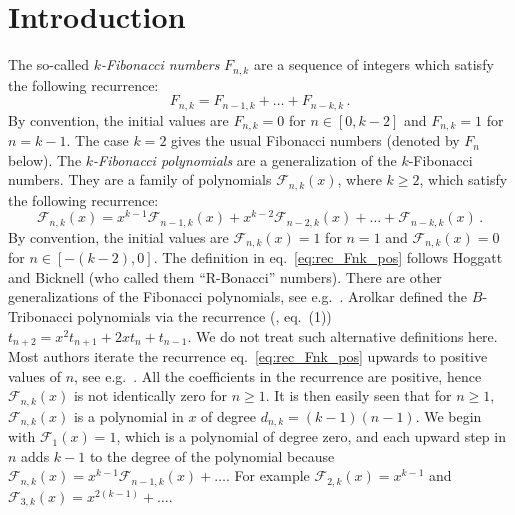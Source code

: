 \documentclass[review]{elsarticle}
\theoremstyle{plain}
\begin{document}
\section{Introduction}\label{sec:intro}
The so-called \textit{$k$-Fibonacci numbers} $F_{n,k}$ are a sequence of integers which satisfy the following recurrence:
\begin{equation}  
\label{eq:rec_Fnk_num}
F_{n,k} = F_{n-1,k} +\dots +F_{n-k,k} \,.
\end{equation}
By convention, the initial values are $F_{n,k}=0$ for $n\in[0,k-2]$ and $F_{n,k}=1$ for $n=k-1$.
The case $k=2$ gives the usual Fibonacci numbers (denoted by $F_n$ below).
The \textit{$k$-Fibonacci polynomials} are a generalization of the $k$-Fibonacci numbers.
They are a family of polynomials $\mathcal{F}_{n,k}(x)$, where $k\ge2$, which satisfy the following recurrence:
\begin{equation}  
\label{eq:rec_Fnk_pos}
\mathcal{F}_{n,k}(x) = x^{k-1}\mathcal{F}_{n-1,k}(x) +x^{k-2}\mathcal{F}_{n-2,k}(x) +\dots +\mathcal{F}_{n-k,k}(x) \,.
\end{equation}
By convention, the initial values are $\mathcal{F}_{n,k}(x)=1$ for $n=1$ and $\mathcal{F}_{n,k}(x)=0$ for $n\in[-(k-2),0]$.
The definition in eq.~\eqref{eq:rec_Fnk_pos} follows Hoggatt and Bicknell \cite{HoggattBicknell_FibGen} (who called them ``R-Bonacci'' numbers).
There are other generalizations of the Fibonacci polynomials, see e.g.~\cite{Ricci,Soykan}.
Arolkar defined the $B$-Tribonacci polynomials via the recurrence (\cite{Arolkar}, eq.~(1))
$t_{n+2} = x^2t_{n+1} +2xt_n + t_{n-1}$.
We do not treat such alternative definitions here.
Most authors iterate the recurrence eq.~\eqref{eq:rec_Fnk_pos}
upwards to positive values of $n$, see e.g.~\cite{Arslan_Uslu,Gupta_etal,HoggattBicknell_FibGen,Koshy,Tasyurdu_Polat}.
All the coefficients in the recurrence are positive, hence $\mathcal{F}_{n,k}(x)$ is not identically zero for $n\ge1$.
It is then easily seen that for $n\ge1$, $\mathcal{F}_{n,k}(x)$ is a polynomial in $x$ of degree $d_{n,k} = (k-1)(n-1)$.
We begin with $\mathcal{F}_1(x)=1$, which is a polynomial of degree zero,
and each upward step in $n$ adds $k-1$ to the degree of the polynomial
because $\mathcal{F}_{n,k}(x)=x^{k-1}\mathcal{F}_{n-1,k}(x)+\dots$.
For example $\mathcal{F}_{2,k}(x)=x^{k-1}$ and $\mathcal{F}_{3,k}(x)=x^{2(k-1)} +\dots$.
\end{document}
